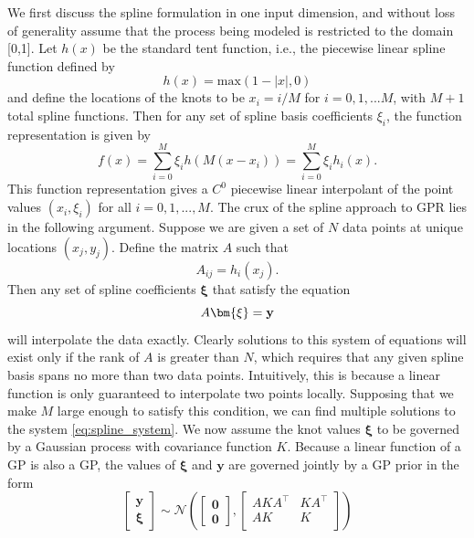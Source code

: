 We first discuss the spline formulation in one input dimension, and without loss of generality assume that the process being modeled is restricted to the domain [0,1]. Let $h(x)$ be the standard tent function, i.e., the piecewise linear spline function defined by
\begin{equation}
h(x) = \text{max}(1-|x|,0)
\end{equation}
and define the locations of the knots to be $x_i = i/M$ for $i=0,1,...M$, with $M+1$ total spline functions. Then for any set of spline basis coefficients $\xi_i$, the function representation is given by
\begin{equation}\label{eq:spline_expansion}
f(x) = \sum_{i=0}^M \xi_i h(M(x-x_i)) = \sum_{i=0}^M \xi_i h_i(x).
\end{equation}
This function representation gives a $C^0$ piecewise linear interpolant of the point values $(x_i, \xi_i)$ for all $i=0,1,...,M$.
The crux of the spline approach to GPR lies in the following argument. Suppose we are given a set of $N$ data points at unique locations $(x_j,y_j)$. Define the matrix $A$ such that
\begin{equation}
A_{ij} = h_i(x_j).
\end{equation}
Then any set of spline coefficients $\bm{\xi}$ that satisfy the equation 
\begin{equation}\label{eq:spline_system}
A\bm{\xi} = \bold{y}
\end{equation}
will interpolate the data exactly. Clearly solutions to this system of equations will exist only if the rank of $A$ is greater than $N$, which requires that any given spline basis spans no more than two data points. Intuitively, this is because a linear function is only guaranteed to interpolate two points locally. Supposing that we make $M$ large enough to satisfy this condition, we can find multiple solutions to the system \eqref{eq:spline_system}.
We now assume the knot values $\bm{\xi}$ to be governed by a Gaussian process with covariance function $K$. Because a linear function of a GP is also a GP, the values of $\bm{\xi}$ and $\mathbf{y}$ are governed jointly  by a GP prior in the form 
\begin{equation}
\begin{bmatrix}
\mathbf{y} \\
\bm{\xi}
\end{bmatrix}
\sim \mathcal{N}\left(
\begin{bmatrix}
\mathbf{0}\\
\mathbf{0}
\end{bmatrix},
\begin{bmatrix}
AKA^\top & KA^\top\\
AK & K\\
\end{bmatrix}
\right)
\end{equation}
